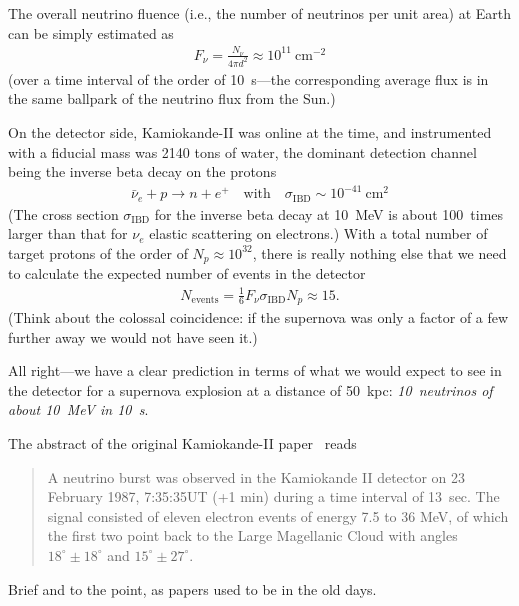 The overall neutrino fluence (i.e., the number of neutrinos per unit area) at Earth
can be simply estimated as
\begin{align*}
  F_\nu = \frac{N_\nu}{4\pi d^2} \approx 10^{11}~\text{cm}^{-2}
\end{align*}
(over a time interval of the order of 10~s---the corresponding average
flux is in the same ballpark of the neutrino flux from the Sun.)

On the detector side, Kamiokande-II was online at the time, and instrumented
with a fiducial mass was 2140 tons of water, the dominant detection channel
being the inverse beta decay on the protons
\begin{align*}
  \bar{\nu}_e + p \rightarrow n + e^+
  \quad \text{with} \quad
  \sigma_\text{IBD} \sim 10^{-41}~\text{cm}^2
\end{align*}
(The cross section $\sigma_\text{IBD}$ for the inverse beta decay at 10~MeV is
about 100~times larger than that for $\nu_e$ elastic scattering on electrons.)
With a total number of target protons of the order of $N_p \approx 10^{32}$,
there is really nothing else that we need to calculate the expected number of
events in the detector
\begin{align*}
  N_\text{events} = \frac{1}{6} F_\nu \sigma_\text{IBD} N_p \approx 15.
\end{align*}
(Think about the colossal coincidence: if the supernova was only a factor
of a few further away we would not have seen it.)

All right---we have a clear prediction in terms of what we would expect to
see in the detector for a supernova explosion at a distance of 50~kpc:
\emph{10~neutrinos of about 10~MeV in 10~s}.

The abstract of the original Kamiokande-II paper~\cite{1987PhRvL..58.1490H} reads
\begin{quote}
  A neutrino burst was observed in the Kamiokande II detector on 23 February 1987,
  7:35:35UT (+1 min) during a time interval of 13~sec. The signal consisted of
  eleven electron events of energy 7.5 to 36 MeV, of which the first two point
  back to the Large Magellanic Cloud with angles $18^\circ \pm 18^\circ$ and
  $15^\circ \pm 27^\circ$.
\end{quote}
Brief and to the point, as papers used to be in the old days.


